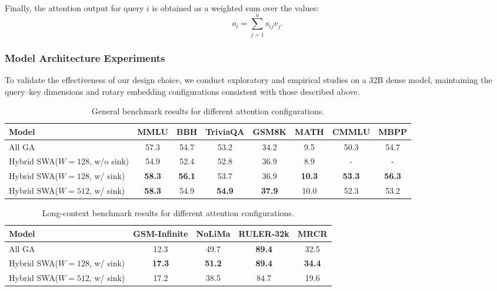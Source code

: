Finally, the attention output for query $i$ is obtained as a weighted sum over the values:
\begin{equation}
o_i = \sum_{j=1}^{n} s_{ij} v_j.
\end{equation}

\subsubsection{Model Architecture Experiments}
To validate the effectiveness of our design choice, we conduct exploratory and empirical studies on a 32B dense model, maintaining the query–key dimensions and rotary embedding configurations consistent with those described above.

\begin{table}[h]
\centering
\small
\begin{tabular}{lccccccc}
\toprule
\textbf{Model} & MMLU & BBH & TriviaQA & GSM8K & MATH & CMMLU & MBPP \\
\midrule
All GA          & 57.3 & 54.7 & 53.2 & 34.2 & 9.5 & 50.3 & 54.7  \\
Hybrid SWA($W = 128$, w/o sink)  & 54.9 & 52.4 & 52.8 & 36.9 & 8.9 & - & - \\
Hybrid SWA($W = 128$, w/ sink)    & \textbf{58.3} & \textbf{56.1} & 53.7 & 36.9 & \textbf{10.3} & \textbf{53.3} & \textbf{56.3} \\
Hybrid SWA($W = 512$, w/ sink)    & \textbf{58.3} & 54.9 & \textbf{54.9} & \textbf{37.9} & 10.0 & 52.3 & 53.2 \\
\bottomrule
\end{tabular}
\caption{General benchmark results for different attention configurations.}
\label{tab:general_ablation}
\end{table}

\begin{table}[h]
\centering
\small
\begin{tabular}{lcccc}
\toprule
\textbf{Model} & GSM-Infinite & NoLiMa & RULER-32k & MRCR  \\
\midrule
All GA          & 12.3 & 49.7 & \textbf{89.4} & 32.5   \\
Hybrid SWA($W = 128$, w/ sink)           & \textbf{17.3} & \textbf{51.2} & \textbf{89.4} & \textbf{34.4}   \\
Hybrid SWA($W = 512$, w/ sink)    & 17.2 & 38.5 & 84.7 & 19.6   \\
\bottomrule
\end{tabular}
\caption{Long-context benchmark results for different attention configurations.}
\label{tab:longcontext_ablation}
\end{table}


